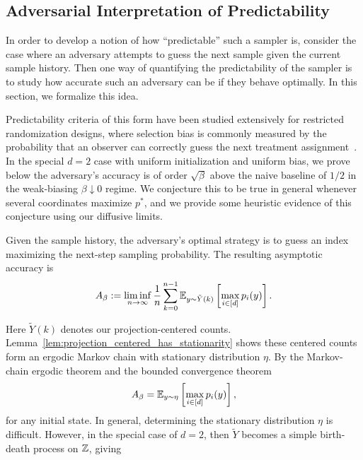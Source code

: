 \subsection{Adversarial Interpretation of Predictability}
\label{sec:adversarial_interpretation}

In order to develop a notion of how ``predictable'' such a sampler is, consider the case 
where an adversary attempts to guess the next sample given the current sample history. 
Then one way of quantifying the predictability of the sampler is to study how accurate 
such an adversary can be if they behave optimally. In this section, we formalize this 
idea.

Predictability criteria of this form have been studied extensively for restricted 
randomization designs, where selection bias is commonly measured by the probability 
that an observer can correctly guess the next treatment assignment~\cite{efron1971_forcing_sequential_experiment_balanced,smith1984_sequential_treatment_allocation_biased_coin,atkinson2002_sequential_clinical_trials_covariate_information}. 
In the special $d=2$ case with uniform initialization and uniform bias, we prove below 
the adversary's accuracy is of order $\sqrt{\beta}$ above the naive baseline of $1/2$ in the weak-biasing $\beta \downarrow 0$ 
regime. We conjecture this to be true in general whenever several coordinates maximize $p^*$, and we provide
some heuristic evidence of this conjecture using our diffusive limits.


Given the sample history, the adversary's optimal strategy is to guess an index maximizing the next-step 
sampling probability. The resulting asymptotic accuracy is
%
\[A_\beta := \liminf_{n \to \infty} \frac{1}{n}\sum_{k=0}^{n-1} \mathbb{E}_{y \sim \tilde{Y}(k)} \left[\max_{i\in[d]} p_i(y)\right].\]

\noindent Here $\tilde{Y}(k)$ denotes our projection-centered counts. Lemma~\ref{lem:projection_centered_has_stationarity}
shows these centered counts form an ergodic Markov chain with stationary distribution $\eta$.
By the Markov-chain ergodic theorem \cite[Theorem~17.0.1]{meyn2009_markov_chains_stochastic_stability} and the bounded convergence theorem
%
    \[A_\beta = \mathbb{E}_{y \sim \eta} \left[\max_{i\in[d]} p_i(y)\right],\]
%
\noindent for any initial state. In general, determining the stationary distribution $\eta$ is difficult. 
However, in the special case of $d=2$, then $\tilde{Y}$ becomes a simple birth-death process 
on $\mathbb{Z}$, giving

